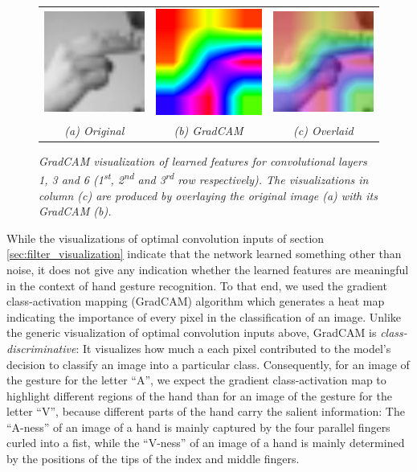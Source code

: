 \documentclass[a4paper]{article}
\newcommand{\ts}{\textsuperscript}
\begin{document}
\begin{figure}[t]
\begin{tabular}{ccc}
          \includegraphics[width=.25\linewidth]{graphics/gradcam/layer6/1_original}&\includegraphics[width=.25\linewidth]{graphics/gradcam/layer6/1_map}&\includegraphics[width=.25\linewidth]{graphics/gradcam/layer6/1_overlaid} \\
          \textit{(a) Original} & \textit{(b) GradCAM} & \textit{(c) Overlaid}
     \end{tabular}
     \caption{\textit{GradCAM visualization of learned features for convolutional layers 1, 3 and 6 (1\ts{st}, 2\ts{nd} and 3\ts{rd} row respectively). The visualizations in column (c) are produced by overlaying the original image (a) with its GradCAM (b).}}
     \label{fig:gradcam}
\end{figure}
While the visualizations of optimal convolution inputs of section \ref{sec:filter_visualization} indicate that the network learned something other than noise, it does not give any indication whether the learned features are meaningful in the context of hand gesture recognition. To that end, we used the gradient class-activation mapping (GradCAM) algorithm \cite{Selvaraju2016} which generates a heat map indicating the importance of every pixel in the classification of an image. Unlike the generic visualization of optimal convolution inputs above, GradCAM is \textit{class-discriminative}: It visualizes how much a each pixel contributed to the model's decision to classify an image into a particular class. Consequently, for an image of the gesture for the letter \enquote{A}, we expect the gradient class-activation map to highlight different regions of the hand than for an image of the gesture for the letter \enquote{V}, because different parts of the hand carry the salient information: The \enquote{A-ness} of an image of a hand is mainly captured by the four parallel fingers curled into a fist, while the \enquote{V-ness} of an image of a hand is mainly determined by the positions of the tips of the index and middle fingers.\\
\end{document}
